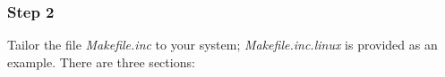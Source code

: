 \documentclass[12pt]{article}
\newcommand{\arpack}{{\sc arpack}}
\newcommand{\arpacks}{{\sc arpack }}
\newcommand{\metis}{{\sc metis}}
\newcommand{\metiss}{{\sc metis }}
\begin{document}

\subsubsection*{Step 2}

Tailor the file {\sl Makefile.inc\/} to your system; {\sl
Makefile.inc.linux\/} is provided as an example. There are three
sections:
\end{document}
